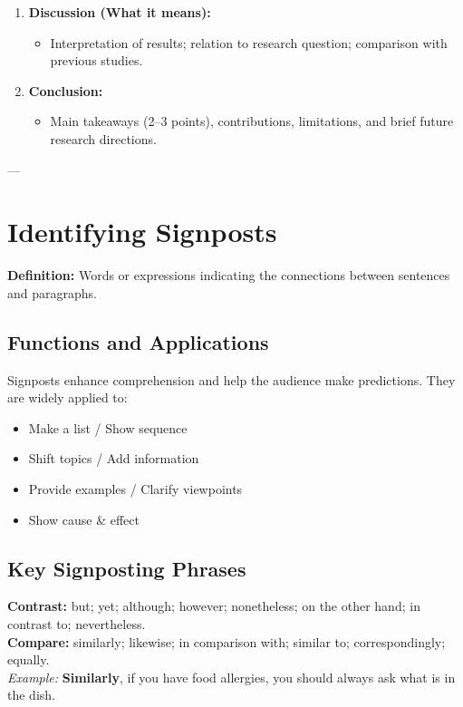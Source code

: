 \documentclass[11pt, a4paper]{article}
\begin{document}
\begin{enumerate}
    \item \textbf{Discussion (What it means):}
    \begin{itemize}
        \item Interpretation of results; relation to research question; comparison with previous studies.
    \end{itemize}
    
    \item \textbf{Conclusion:}
    \begin{itemize}
        \item Main takeaways (2--3 points), contributions, limitations, and brief future research directions.
    \end{itemize}
\end{enumerate}

---

\section{Identifying Signposts}

\textbf{Definition:} Words or expressions indicating the connections between sentences and paragraphs.

\subsection{Functions and Applications}
Signposts enhance comprehension and help the audience make predictions. They are widely applied to:
\begin{itemize}
    \item Make a list / Show sequence
    \item Shift topics / Add information
    \item Provide examples / Clarify viewpoints
    \item Show cause \& effect
\end{itemize}

\subsection{Key Signposting Phrases}

\begin{tcolorbox}[colback=blue!5!white,colframe=blue!75!black,title=To Contrast \& Compare]
\textbf{Contrast:} but; yet; although; however; nonetheless; on the other hand; in contrast to; nevertheless. \\
\textbf{Compare:} similarly; likewise; in comparison with; similar to; correspondingly; equally. \\
\textit{Example:} \textbf{Similarly}, if you have food allergies, you should always ask what is in the dish.
\end{tcolorbox}
\end{document}
